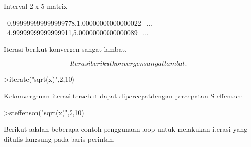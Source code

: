 \documentclass[a4paper,10pt]{article}
\begin{document}
\begin{eulernotebook}
\begin{eulercomment}
\begin{eulercomment}
\begin{eulercomment}
\begin{eulercomment}
\begin{eulercomment}
\begin{eulercomment}
\begin{eulercomment}
\begin{eulercomment}
\begin{eulercomment}
\begin{eulercomment}
\begin{eulercomment}
\begin{eulercomment}
\begin{eulercomment}
\begin{eulercomment}
\begin{eulercomment}
\begin{eulercomment}
\begin{eulercomment}
\begin{eulercomment}
\begin{eulercomment}
\begin{eulercomment}
\begin{eulercomment}
\begin{eulercomment}
\begin{eulercomment}
\begin{eulercomment}
\begin{eulercomment}
\begin{eulercomment}
\begin{eulercomment}
\begin{eulercomment}
\begin{eulercomment}
\begin{eulercomment}
\begin{eulercomment}
\begin{eulercomment}
\begin{eulerprompt}
\end{eulerprompt}
\begin{euleroutput}
  Interval 2 x 5 matrix
  
  ~0.999999999999999778,1.00000000000000022~     ...
  ~4.99999999999999911,5.00000000000000089~     ...
\end{euleroutput}
\begin{eulercomment}
Iterasi berikut konvergen sangat lambat.

\end{eulercomment}
\begin{eulerformula}
\[
Iterasi berikut konvergen sangat lambat.
\]
\end{eulerformula}
\begin{eulerprompt}
>iterate("sqrt(x)",2,10)
\end{eulerprompt}
\begin{euleroutput}
  [2,  1.41421,  1.18921,  1.09051,  1.04427,  1.0219,  1.01089,
  1.00543,  1.00271,  1.00135,  1.00068]
\end{euleroutput}
\begin{eulercomment}
Kekonvergenan iterasi tersebut dapat dipercepatdengan percepatan
Steffenson:
\end{eulercomment}
\begin{eulerprompt}
>steffenson("sqrt(x)",2,10)
\end{eulerprompt}
\begin{euleroutput}
  [1.04888,  1.00028,  1,  1]
\end{euleroutput}
\begin{eulercomment}
\begin{eulercomment}
\begin{eulercomment}
Berikut adalah beberapa contoh penggunaan loop untuk melakukan iterasi
yang ditulis langsung pada baris perintah.
\end{eulercomment}

\end{eulercomment}
\end{eulercomment}
\end{eulercomment}
\end{eulercomment}
\end{eulercomment}
\end{eulercomment}
\end{eulercomment}
\end{eulercomment}
\end{eulercomment}
\end{eulercomment}
\end{eulercomment}
\end{eulercomment}
\end{eulercomment}
\end{eulercomment}
\end{eulercomment}
\end{eulercomment}
\end{eulercomment}
\end{eulercomment}
\end{eulercomment}
\end{eulercomment}
\end{eulercomment}
\end{eulercomment}
\end{eulercomment}
\end{eulercomment}
\end{eulercomment}
\end{eulercomment}
\end{eulercomment}
\end{eulercomment}
\end{eulercomment}
\end{eulercomment}
\end{eulercomment}
\end{eulercomment}
\end{eulercomment}
\end{eulercomment}
\end{eulernotebook}
\end{document}
